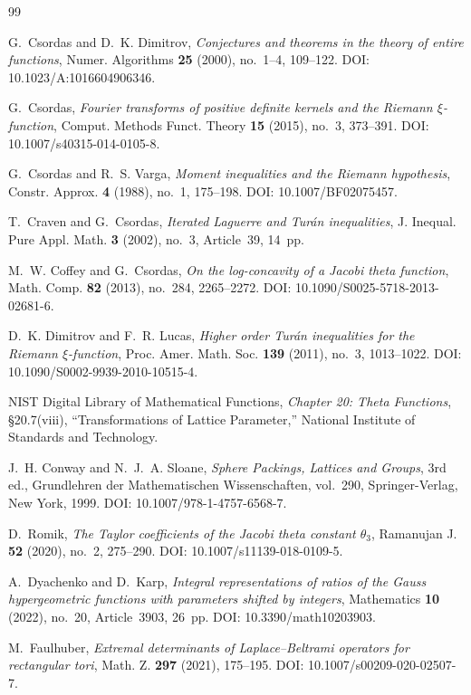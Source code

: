 \documentclass{amsart}
\numberwithin{equation}{section}
\theoremstyle{definition}
\theoremstyle{remark}
\begin{document}
\begin{thebibliography}{99}

G.~Csordas and D.~K. Dimitrov,
\emph{Conjectures and theorems in the theory of entire functions},
Numer. Algorithms \textbf{25} (2000), no.~1--4, 109--122.
DOI: 10.1023/A:1016604906346.

G.~Csordas,
\emph{Fourier transforms of positive definite kernels and the Riemann $\xi$-function},
Comput. Methods Funct. Theory \textbf{15} (2015), no.~3, 373--391.
DOI: 10.1007/s40315-014-0105-8.

G.~Csordas and R.~S. Varga,
\emph{Moment inequalities and the Riemann hypothesis},
Constr. Approx. \textbf{4} (1988), no.~1, 175--198.
DOI: 10.1007/BF02075457.

T.~Craven and G.~Csordas,
\emph{Iterated Laguerre and Tur\'an inequalities},
J. Inequal. Pure Appl. Math. \textbf{3} (2002), no.~3, Article~39, 14~pp.

M.~W. Coffey and G.~Csordas,
\emph{On the log-concavity of a Jacobi theta function},
Math. Comp. \textbf{82} (2013), no.~284, 2265--2272.
DOI: 10.1090/S0025-5718-2013-02681-6.

D.~K. Dimitrov and F.~R. Lucas,
\emph{Higher order Tur\'an inequalities for the Riemann $\xi$-function},
Proc. Amer. Math. Soc. \textbf{139} (2011), no.~3, 1013--1022.
DOI: 10.1090/S0002-9939-2010-10515-4.

NIST Digital Library of Mathematical Functions,
\emph{Chapter 20: Theta Functions}, \S20.7(viii), ``Transformations of Lattice Parameter,''
National Institute of Standards and Technology.

J.~H. Conway and N.~J.~A. Sloane,
\emph{Sphere Packings, Lattices and Groups},
3rd ed., Grundlehren der Mathematischen Wissenschaften, vol.~290,
Springer-Verlag, New York, 1999.
DOI: 10.1007/978-1-4757-6568-7.

D.~Romik,
\emph{The Taylor coefficients of the Jacobi theta constant $\theta_3$},
Ramanujan J. \textbf{52} (2020), no.~2, 275--290.
DOI: 10.1007/s11139-018-0109-5.

A.~Dyachenko and D.~Karp,
\emph{Integral representations of ratios of the Gauss hypergeometric functions with parameters shifted by integers},
Mathematics \textbf{10} (2022), no.~20, Article~3903, 26~pp.
DOI: 10.3390/math10203903.

M.~Faulhuber,
\emph{Extremal determinants of Laplace--Beltrami operators for rectangular tori},
Math. Z. \textbf{297} (2021), 175--195.
DOI: 10.1007/s00209-020-02507-7.

\end{thebibliography}
\end{document}
